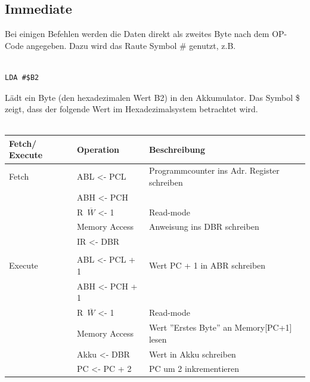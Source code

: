 \documentclass[a4paper,10pt]{report}
\begin{document}
\subsection{Immediate}
Bei einigen Befehlen werden die Daten direkt als zweites Byte nach dem OP-Code angegeben. Dazu wird das Raute Symbol \# genutzt, z.B. \\\\
\begin{lstlisting}[]
LDA #$B2
\end{lstlisting}
Lädt ein Byte (den hexadezimalen Wert B2) in den Akkumulator. Das Symbol \$ zeigt, dass der folgende Wert im Hexadezimalsystem betrachtet wird.
\\\\ 
\begin{tabularx}{\textwidth}{l|l|X}
Fetch/ Execute & Operation & Beschreibung \\ \hline 
Fetch&ABL <- PCL & Programmcounter ins Adr. Register schreiben\\
 &ABH <- PCH & \\
 &R\ $\overline{W}$ <- 1 & Read-mode\\
 &Memory Access & Anweisung ins DBR schreiben\\
 &IR <- DBR & \\ \\
Execute&ABL <- PCL + 1 &  Wert PC + 1 in ABR schreiben\\
 &ABH <- PCH + 1 & \\
 &R\ $\overline{W}$ <- 1 & Read-mode\\
 &Memory Access & Wert ''Erstes Byte'' an Memory[PC+1] lesen\\
 &Akku <- DBR & Wert in Akku schreiben\\
 &PC <- PC + 2 & PC um 2 inkrementieren\\
\end{tabularx}
\end{document}
